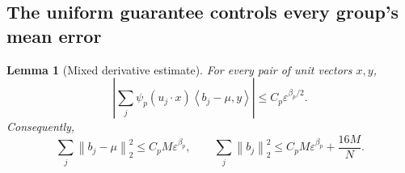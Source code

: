 \documentclass[11pt,letterpaper]{article}
\newtheorem{lemma}[theorem]{Lemma}
\theoremstyle{definition}
\theoremstyle{remark}
\numberwithin{equation}{section}
\newcommand{\eps}{\varepsilon}
\newcommand{\norm}[1]{\left\lVert#1\right\rVert}
\newcommand{\ip}[2]{\left\langle#1,#2\right\rangle}
\begin{document}
\subsection{The uniform guarantee controls every group's mean error}
\begin{lemma}[Mixed derivative estimate]\label{lem:derivative}
For every pair of unit vectors $x,y$,
\begin{equation}\label{eq:derivativebound}
 \left|\sum_j\psi_p(u_j\cdot x)\ip{b_j-\mu}{y}\right|
 \le C_p\eps^{\beta_p/2}.
\end{equation}
Consequently,
\begin{equation}\label{eq:meanerrors}
 \sum_j\norm{b_j-\mu}_2^2\le C_pM\eps^{\beta_p},\qquad
 \sum_j\norm{b_j}_2^2\le C_pM\eps^{\beta_p}+\frac{16M}{N}.
\end{equation}
\end{lemma}
\end{document}
